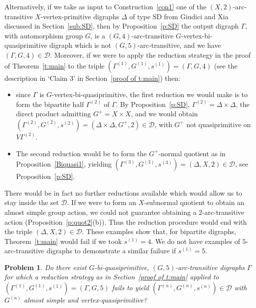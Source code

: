 \documentclass[11pt]{amsart}
\newtheorem{problem}{Problem}
\newcommand\DD{{\mathscr{D}}}
\begin{document}
Alternatively, if we take as input to  Construction~\ref{con1} one of the $(X,2)$-arc-transitive $X$-vertex-primitive digraphs $\Delta$ of type SD from  Giudici and Xia~\cite[Theorem 1.2]{quasi} discussed in Section~\ref{sub:SD}, then by Proposition~\ref{p:SD} the output digraph $\Gamma$, with automorphism group $G$, is a $(G,4)$-arc-transitive $G$-vertex-bi-quasiprimitive digraph which is not $(G,5)$-arc-transitive, and we have $(\Gamma,G,4)\in\DD$.
%
Moreover, if we were to apply the reduction strategy in the proof of Theorem~\ref{t:main} to the triple $(\Gamma^{(1)},G^{(1)},s^{(1)}) = (\Gamma,G,4)$ (see the description in `Claim 3' in Section~\ref{proof of t:main}) then: 
\begin{itemize}
    \item since $\Gamma$ is $G$-vertex-bi-quasiprimitive, the first reduction we would make is to form the bipartite half $\Gamma^{(2)}$ of $\Gamma$. By Proposition~\ref{p:SD}, $\Gamma^{(2)}=\Delta\times\Delta$, the direct product  admitting $G^+= X\times X$, and we would obtain $(\Gamma^{(2)},G^{(2)},s^{(2)}) = (\Delta\times\Delta,G^+,2)\in\DD$, with $G^+$ not quasiprimitive on $V\Gamma^{(2)}$. 
    \item The second reduction would be to form the $G^+$-normal quotient as in Proposition~\ref{Biquasi1}, yielding $(\Gamma^{(3)},G^{(3)},s^{(3)}) = (\Delta,X,2)\in\DD$, see Proposition~\ref{p:SD}.
\end{itemize}
%
There would be in fact no further  reductions available which would allow us to stay inside the set $\DD$.  If we were to form an $X$-subnormal quotient to obtain an almost simple group action,  we could not guarantee obtaining a $2$-arc-transitive action (Proposition~\ref{p:quot2}(b)). Thus the reduction procedure would end with the triple $(\Delta,X,2)\in\DD$. These examples show that, for bipartite digraphs, Theorem~\ref{t:main} would fail if we took $s^{(1)}=4$. We do not have examples of $5$-arc-transitive digraphs to demonstrate a similar failure if  $s^{(1)}=5$.

\begin{problem}\label{p5}
    Do there exist \(G\)-bi-quasiprimitive, \((G,5)\)-arc-transitive digraphs $\Gamma$ for which a reduction strategy as in Section~\ref{proof of t:main} applied to $(\Gamma^{(1)},G^{(1)},s^{(1)}) = (\Gamma,G,5)$ fails to yield  $(\Gamma^{(n)},G^{(n)},s^{(n)})\in\DD$ with $G^{(n)}$ almost simple and vertex-quasiprimitive? %
\end{problem}
\end{document}
